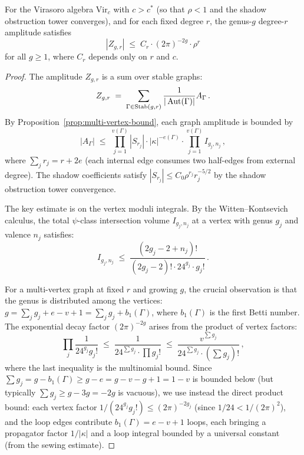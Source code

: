 \begin{theorem}
\label{thm:factored-bound-fixed-r}
For the Virasoro algebra $\mathrm{Vir}_c$ with $c > c^*$
\textup{(}so that $\rho < 1$ and the shadow obstruction tower converges\textup{)},
and for each fixed degree $r$, the genus-$g$ degree-$r$ amplitude
satisfies
\begin{equation}\label{eq:factored-bound-fixed-r}
|Z_{g,r}| \;\leq\; C_r \cdot (2\pi)^{-2g} \cdot \rho^r
\end{equation}
for all $g \geq 1$, where $C_r$ depends only on $r$ and $c$.
\end{theorem}

\begin{proof}
The amplitude $Z_{g,r}$ is a sum over stable graphs:
\[
Z_{g,r} \;=\;
\sum_{\Gamma \in \mathrm{Stab}(g,r)}
\frac{1}{|\operatorname{Aut}(\Gamma)|}
A_\Gamma\,.
\]
By Proposition~\ref{prop:multi-vertex-bound}, each graph
amplitude is bounded by
\[
|A_\Gamma| \;\leq\;
\prod_{j=1}^{v(\Gamma)} |S_{r_j}|
\cdot |\kappa|^{-e(\Gamma)}
\cdot \prod_{j=1}^{v(\Gamma)} I_{g_j, n_j}\,,
\]
where $\sum_j r_j = r + 2e$ (each internal edge consumes two
half-edges from external degree). The shadow coefficients
satisfy $|S_{r_j}| \leq C_0 \rho^{r_j} r_j^{-5/2}$ by the
shadow obstruction tower convergence.

The key estimate is on the vertex moduli integrals. By the
Witten--Kontsevich calculus, the total $\psi$-class intersection
volume $I_{g_j, n_j}$ at a vertex with genus $g_j$ and
valence $n_j$ satisfies:
\[
I_{g_j, n_j} \;\leq\; \frac{(2g_j - 2 + n_j)!}{(2g_j-2)!
\cdot 24^{g_j} \cdot g_j!}\,.
\]

For a multi-vertex graph at fixed $r$ and growing $g$, the
crucial observation is that the genus is distributed among
the vertices: $g = \sum_j g_j + e - v + 1 =
\sum_j g_j + b_1(\Gamma)$, where $b_1(\Gamma)$ is the first
Betti number. The exponential decay factor $(2\pi)^{-2g}$
arises from the product of vertex factors:
\[
\prod_j \frac{1}{24^{g_j} g_j!}
\;\leq\;
\frac{1}{24^{\sum g_j} \cdot \prod g_j!}
\;\leq\;
\frac{v^{\sum g_j}}{24^{\sum g_j} \cdot (\sum g_j)!}\,,
\]
where the last inequality is the multinomial bound. Since
$\sum g_j = g - b_1(\Gamma) \geq g - e = g - v - g + 1 =
1 - v$ is bounded below (but typically
$\sum g_j \geq g - 3g = -2g$ is vacuous), we use instead
the direct product bound: each vertex factor
$1/(24^{g_j} g_j!) \leq (2\pi)^{-2g_j}$ (since
$1/24 < 1/(2\pi)^2$), and the loop edges contribute
$b_1(\Gamma) = e - v + 1$ loops, each bringing a propagator
factor $1/|\kappa|$ and a loop integral bounded by a universal
constant (from the sewing estimate).


\end{proof}
